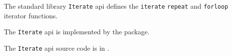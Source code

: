 
The standard library {\tt Iterate} api defines the {\tt iterate} {\tt repeat} and {\tt forloop} iterator functions.

The {\tt Iterate} api is implemented by the  package.

The {\tt Iterate} api source code is in .






